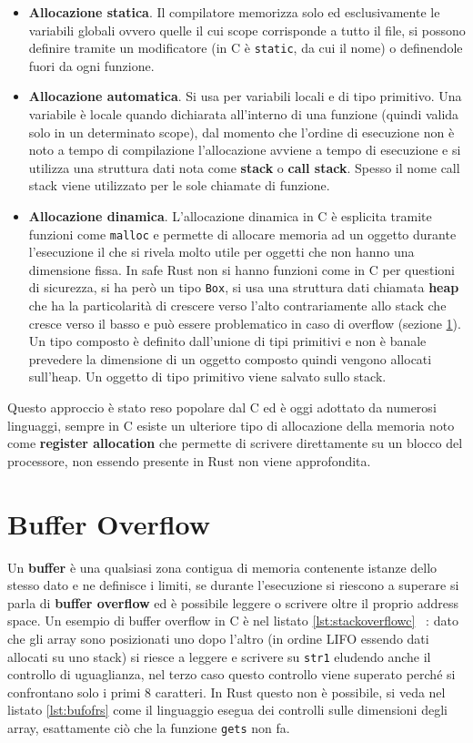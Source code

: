 \documentclass[Lau,binding=0.6cm]{sapthesis}
\begin{document}
\begin{itemize}
    \item \textbf{Allocazione statica}. Il compilatore memorizza solo ed esclusivamente le variabili globali ovvero quelle il cui scope corrisponde a tutto il file, si possono definire tramite un modificatore (in C è \colorbox{backcolour}{\texttt{static}}, da cui il nome) o definendole fuori da ogni funzione.  
    \item \textbf{Allocazione automatica}. Si usa per variabili locali e di tipo primitivo. Una variabile è locale quando dichiarata all'interno di una funzione (quindi valida solo in un determinato scope), dal momento che l'ordine di esecuzione non è noto a tempo di compilazione l'allocazione avviene a tempo di esecuzione e si utilizza una struttura dati nota come \textbf{stack} o \textbf{call stack}. Spesso il nome call stack viene utilizzato per le sole chiamate di funzione. 
    \item \textbf{Allocazione dinamica}. L'allocazione dinamica in C è esplicita tramite funzioni come \colorbox{backcolour}{\texttt{malloc}} e permette di allocare memoria ad un oggetto durante l'esecuzione il che si rivela molto utile per oggetti che non hanno una dimensione fissa. In safe Rust non si hanno funzioni come in C per questioni di sicurezza, si ha però un tipo \colorbox{backcolour}{\texttt{Box}}, si usa una struttura dati chiamata \textbf{heap} che ha la particolarità di crescere verso l'alto contrariamente allo stack che cresce verso il basso e può essere problematico in caso di overflow (sezione \ref{sec:buffer_overflow}). Un tipo composto è definito dall'unione di tipi primitivi e non è banale prevedere la dimensione di un oggetto composto quindi vengono allocati sull'heap. Un oggetto di tipo primitivo viene salvato sullo stack. 
\end{itemize}

Questo approccio è stato reso popolare dal C ed è oggi adottato da numerosi linguaggi, sempre in C esiste un ulteriore tipo di allocazione della memoria noto come \textbf{register allocation} che permette di scrivere direttamente su un blocco del processore, non essendo presente in Rust non viene approfondita.

\section{Buffer Overflow} \label{sec:buffer_overflow}
Un \textbf{buffer} è una qualsiasi zona contigua di memoria contenente istanze dello stesso dato e ne definisce i limiti, se durante l'esecuzione si riescono a superare si parla di \textbf{buffer overflow} ed è possibile leggere o scrivere oltre il proprio address space. Un esempio di buffer overflow in C è nel listato \ref{lst:stackoverflowc} ~\cite[7.5]{stallings:os}: dato che gli array sono posizionati uno dopo l'altro (in ordine LIFO essendo dati allocati su uno stack) si riesce a leggere e scrivere su \texttt{str1} eludendo anche il controllo di uguaglianza, nel terzo caso questo controllo viene superato perché si confrontano solo i primi 8 caratteri. In Rust questo non è possibile, si veda nel listato \ref{lst:bufofrs} come il linguaggio esegua dei controlli sulle dimensioni degli array, esattamente ciò che la funzione \texttt{gets} non fa. 
\end{document}
